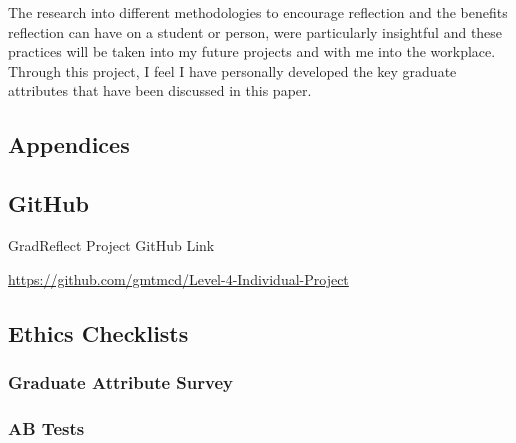\documentclass{l4proj}
\begin{document}
The research into different methodologies to encourage reflection and the benefits reflection can have on a student or person, were particularly insightful and these practices will be taken into my future projects and with me into the workplace. Through this project, I feel I have personally developed the key graduate attributes that have been discussed in this paper.

%
% 

\begin{appendices}

\chapter{Appendices}

\section{GitHub}\label{AppendixGitHub}

GradReflect Project GitHub Link

\url{https://github.com/gmtmcd/Level-4-Individual-Project}

%

\section{Ethics Checklists}

\subsection{Graduate Attribute Survey}



\subsection{AB Tests}




\end{appendices}
\end{document}
